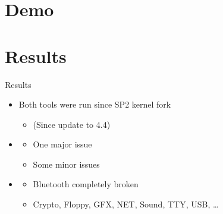 \section{Demo}
\frame{\sectionpage}

\section{Results}
\frame{\sectionpage}

\begin{frame}{Results}

  \begin{itemize}
    \item Both tools were run since SP2 kernel fork
    \begin{itemize}
      \item (Since update to 4.4)
    \end{itemize}

    \pause

    \item \trin
    \begin{itemize}
      \item One major issue
      \item Some minor issues
    \end{itemize}

    \pause

    \item \syz
    \begin{itemize}
      \item Bluetooth completely broken

      \pause

      \item Crypto, Floppy, GFX, NET, Sound, TTY, USB, \dots
    \end{itemize}
  \end{itemize}

\end{frame}

